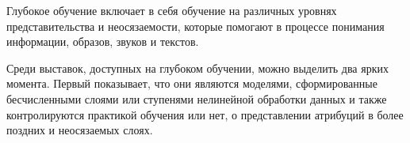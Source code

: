 \begin{frame}

    Глубокое обучение включает в себя обучение на различных уровнях представительства и неосязаемости,
    которые помогают в процессе понимания информации, образов, звуков и текстов.

    Среди выставок, доступных на глубоком обучении, можно выделить два ярких момента. Первый показывает, что они являются моделями,
    сформированные бесчисленными слоями или ступенями нелинейной обработки данных и также контролируются практикой обучения или нет,
    о представлении атрибуций в более поздних и неосязаемых слоях.

\end{frame}